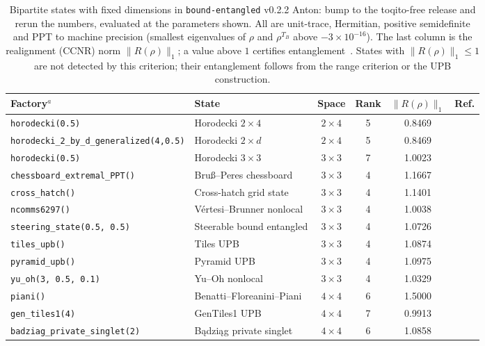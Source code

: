 \documentclass[aps,pra,twocolumn,superscriptaddress,groupedaddress]{revtex4-2}
\newcommand{\code}[1]{\texttt{#1}}
\newcommand{\anton}[1]{{\color{antongreen} Anton: #1}}
\begin{document}
\begin{table}[t]
\caption{Bipartite states with fixed dimensions in \code{bound-entangled}
v0.2.2 \anton{bump to the toqito-free release and rerun the numbers}, evaluated at the parameters shown. All are unit-trace, Hermitian,
positive semidefinite and PPT to machine precision (smallest eigenvalues of
$\rho$ and $\rho^{T_B}$ above $-3\times10^{-16}$). The last column is the
realignment (CCNR) norm $\|R(\rho)\|_1$; a value above $1$ certifies
entanglement~\cite{Rudolph2005,Chen2003}. States with $\|R(\rho)\|_1\le 1$ are
not detected by this criterion; their entanglement follows from the range
criterion or the UPB construction.}
\label{tab:states}
\begin{ruledtabular}
\begin{tabular}{llcccl}
Factory$^{a}$ & State & Space & Rank & $\|R(\rho)\|_1$ & Ref. \\
\hline
\code{horodecki(0.5)} & Horodecki $2\times4$ & $2\times4$ & 5 & 0.8469 & \cite{Horodecki1997} \\
\code{horodecki\_2\_by\_d\_generalized(4,0.5)} & Horodecki $2\times d$ & $2\times4$ & 5 & 0.8469 & \cite{Tura2012} \\
\code{horodecki(0.5)} & Horodecki $3\times3$ & $3\times3$ & 7 & 1.0023 & \cite{Horodecki1997} \\
\code{chessboard\_extremal\_PPT()} & Bru\ss--Peres chessboard & $3\times3$ & 4 & 1.1667 & \cite{Bruss2000} \\
\code{cross\_hatch()} & Cross-hatch grid state & $3\times3$ & 4 & 1.1401 & \cite{Lockhart2018} \\
\code{ncomms6297()} & V\'ertesi--Brunner nonlocal & $3\times3$ & 4 & 1.0038 & \cite{Vertesi2014} \\
\code{steering\_state(0.5, 0.5)} & Steerable bound entangled & $3\times3$ & 4 & 1.0726 & \cite{Moroder2014} \\
\code{tiles\_upb()} & Tiles UPB & $3\times3$ & 4 & 1.0874 & \cite{Bennett1999UPB} \\
\code{pyramid\_upb()} & Pyramid UPB & $3\times3$ & 4 & 1.0975 & \cite{Bennett1999UPB} \\
\code{yu\_oh(3, 0.5, 0.1)} & Yu--Oh nonlocal & $3\times3$ & 4 & 1.0329 & \cite{YuOh2017} \\
\code{piani()} & Benatti--Floreanini--Piani & $4\times4$ & 6 & 1.5000 & \cite{Benatti2004} \\
\code{gen\_tiles1(4)} & GenTiles1 UPB & $4\times4$ & 7 & 0.9913 & \cite{DiVincenzo2003} \\
\code{badziag\_private\_singlet(2)} & B\k{a}dzi\k{a}g private singlet & $4\times4$ & 6 & 1.0858 & \cite{Pal2021} \\

\end{tabular}
\end{ruledtabular}
\end{table}
\end{document}
